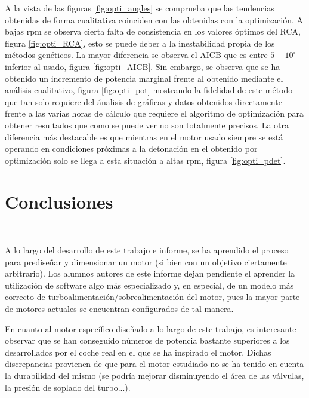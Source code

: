 A la vista de las figuras \ref{fig:opti_angles} se comprueba que las tendencias obtenidas de forma cualitativa coinciden con las obtenidas con la optimización. A bajas rpm se observa %
cierta falta de consistencia en los valores óptimos del RCA, figura \ref{fig:opti_RCA}, esto se puede deber a la inestabilidad propia de los métodos genéticos. La mayor diferencia se %
observa el AICB que es entre $5-10^\circ$ inferior al usado, figura \ref{fig:opti_AICB}. Sin  embargo, se observa que se ha obtenido un incremento de potencia marginal frente al obtenido mediante el análisis cualitativo, figura \ref{fig:opti_pot} %
mostrando la fidelidad de este método que tan solo requiere del ánalisis de gráficas y datos obtenidos directamente frente a las varias horas de cálculo que requiere el algoritmo de optimización %
para obtener resultados que como se puede ver no son totalmente precisos. La otra diferencia más destacable es que mientras en el motor usado siempre se está operando en condiciones próximas a la %
detonación en el obtenido por optimización solo se llega a esta situación a altas rpm, figura \ref{fig:opti_pdet}.


\section{Conclusiones} \label{s:section_09}

A lo largo del desarrollo de este trabajo e informe, se ha aprendido el proceso para prediseñar y dimensionar un motor (si bien con un objetivo ciertamente arbitrario). Los alumnos autores de este informe dejan pendiente el aprender la utilización de software algo más especializado y, en especial, de un modelo más correcto de turboalimentación/sobrealimentación del motor, pues la mayor parte de motores actuales se encuentran configurados de tal manera.

En cuanto al motor específico diseñado a lo largo de este trabajo, es interesante observar que se han conseguido números de potencia bastante superiores a los desarrollados por el coche real en el que se ha inspirado el motor. Dichas discrepancias provienen de que para el motor estudiado no se ha tenido en cuenta la durabilidad del mismo (se podría mejorar disminuyendo el área de las válvulas, la presión de soplado del turbo...).

